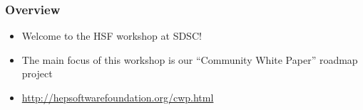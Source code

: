 \begin{frame}
\frametitle{Overview}

\begin{itemize}
\item Welcome to the HSF workshop at SDSC!
\item The main focus of this workshop is our ``Community White Paper'' roadmap project
\item \url{http://hepsoftwarefoundation.org/cwp.html}
\end{itemize}

\end{frame}



